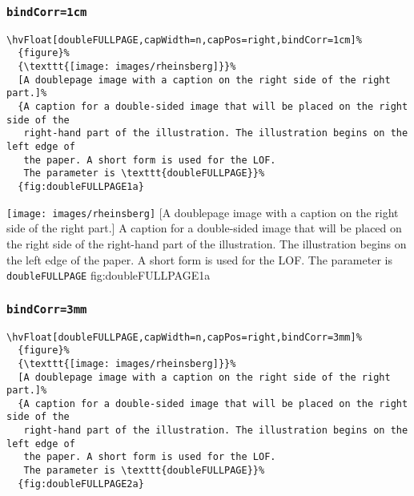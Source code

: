 \documentclass[twoside]{scrartcl}
\makeatletter
\let\hvBlindtext\Blindtext
\def\Blindtext{\par\color{black!40}\hvBlindtext\par\normalcolor}
\def\hvblindtext{\textcolor{black!40}{\blindtext@text}}
\makeatother
\begin{document}
\Blindtext


\Blindtext





\subsubsection{\texttt{bindCorr=1cm}}

\begin{lstlisting}
\hvFloat[doubleFULLPAGE,capWidth=n,capPos=right,bindCorr=1cm]%
  {figure}%
  {\texttt{[image: images/rheinsberg]}}%
  [A doublepage image with a caption on the right side of the right part.]%
  {A caption for a double-sided image that will be placed on the right side of the
   right-hand part of the illustration. The illustration begins on the left edge of 
   the paper. A short form is used for the LOF. 
   The parameter is \texttt{doubleFULLPAGE}}%
  {fig:doubleFULLPAGE1a}
\end{lstlisting}

%
  {\texttt{[image: images/rheinsberg]}}%
  [A doublepage image with a caption on the right side of the right part.]%
  {A caption for a double-sided image that will be placed on the right side of the
   right-hand part of the illustration. The illustration begins on the left edge of 
   the paper. A short form is used for the LOF. 
   The parameter is \texttt{doubleFULLPAGE}}%
  {fig:doubleFULLPAGE1a}

\hvblindtext

\Blindtext

\Blindtext

\subsubsection{\texttt{bindCorr=3mm}}
\begin{lstlisting}
\hvFloat[doubleFULLPAGE,capWidth=n,capPos=right,bindCorr=3mm]%
  {figure}%
  {\texttt{[image: images/rheinsberg]}}%
  [A doublepage image with a caption on the right side of the right part.]%
  {A caption for a double-sided image that will be placed on the right side of the
   right-hand part of the illustration. The illustration begins on the left edge of 
   the paper. A short form is used for the LOF. 
   The parameter is \texttt{doubleFULLPAGE}}%
  {fig:doubleFULLPAGE2a}
\end{lstlisting}
\end{document}
